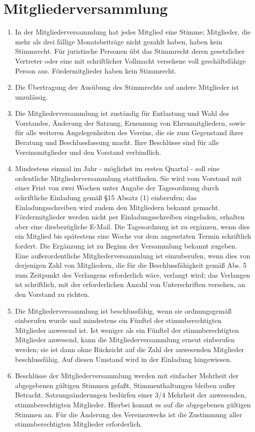 \documentclass[ngerman]{scrartcl}
\begin{document}
\section{Mitgliederversammlung} \label{sec:mitgliederversammlung}
\begin{enumerate}
 \item In der Mitgliederversammlung hat jedes Mitglied eine Stimme; 
 Mitglieder, die mehr als drei fällige Monatsbeiträge nicht gezahlt 
 haben, haben kein Stimmrecht. Für juristische Personen übt das 
 Stimmrecht deren gesetzlicher Vertreter  oder eine mit schriftlicher 
 Vollmacht versehene voll geschäftsfähige Person aus. Fördermitglieder
 haben kein Stimmrecht.

 \item Die Übertragung der Ausübung des Stimmrechts auf andere
 Mitglieder ist unzulässig.

 \item Die Mitgliederversammlung ist zuständig für Entlastung
 und Wahl des Vorstandes, Änderung der Satzung, Ernennung von
 Ehrenmitgliedern, sowie für alle weiteren Angelegenheiten des
 Vereins, die sie zum Gegenstand ihrer Beratung und
 Beschlussfassung macht. Ihre Beschlüsse sind für alle
 Vereinsmitglieder und den Vorstand verbindlich.
 \item Mindestens einmal im Jahr - möglichst im ersten Quartal -
 soll eine ordentliche Mitgliederversammlung stattfinden. Sie
 wird vom Vorstand mit einer Frist von zwei Wochen unter
 Angabe der Tagesordnung durch schriftliche Einladung gemäß
 §15 Absatz (1) einberufen; das Einladungsschreiben wird zudem
 den Mitgliedern bekannt gemacht. Fördermitglieder werden nicht
 per Einladungsschreiben eingeladen, erhalten aber eine diesbezügliche
 E-Mail. Die Tagesordnung ist zu ergänzen,
 wenn dies ein Mitglied bis spätestens eine Woche vor dem
 angesetzten Termin schriftlich fordert. Die Ergänzung ist zu
 Beginn der Versammlung bekannt zugeben. Eine außerordentliche
 Mitgliederversammlung ist einzuberufen, wenn dies von
 derjenigen Zahl von Mitgliedern, die für die
 Beschlussfähigkeit gemäß Abs. 5 zum Zeitpunkt des Verlangens
 erforderlich wäre, verlangt wird; das Verlangen ist
 schriftlich, mit der erforderlichen Anzahl von Unterschriften
 versehen, an den Vorstand zu richten.
 \item Die Mitgliederversammlung ist beschlussfähig, wenn sie
 ordnungsgemäß einberufen wurde und mindestens ein Fünftel der
 stimmberechtigten Mitglieder anwesend ist. Ist weniger als
 ein Fünftel der stimmberechtigten Mitglieder anwesend, kann
 die  Mitgliederversammlung erneut einberufen werden; sie ist
 dann ohne Rücksicht auf die Zahl der anwesenden Mitglieder
 beschlussfähig. Auf diesen Umstand wird in der Einladung
 hingewiesen.

 \item Beschlüsse der Mitgliederversammlung werden mit einfacher
 Mehrheit der abgegebenen gültigen Stimmen gefaßt,
 Stimmenthaltungen bleiben außer Betracht. Satzungsänderungen
 bedürfen einer 3/4 Mehrheit der anwesenden, stimmberechtigten
 Mitglieder. Hierbei kommt es auf die abgegebenen gültigen
 Stimmen an. Für die Änderung des Vereinszwecks ist die
 Zustimmung aller stimmberechtigten Mitglieder erforderlich.
\end{enumerate}
\end{document}
